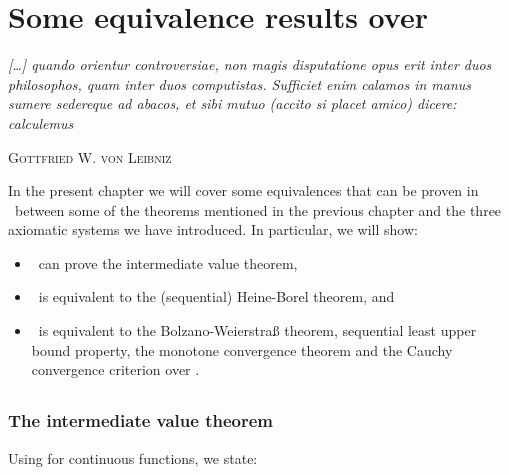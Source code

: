 \documentclass[../main.tex]{memoir}
\begin{document}
\chapter{Some equivalence results over \rca}

\epigraph{
  \textit{
    [\ldots] quando orientur controversiae, non magis disputatione opus erit inter duos
    philosophos, quam inter duos computistas. Sufficiet enim calamos in manus
    sumere sedereque ad abacos, et sibi mutuo (accito si placet amico)
    dicere: calculemus
  }
}{\textsc{Gottfried W. von Leibniz}}

In the present chapter we will cover some equivalences that can be proven in \rca\ between some of the theorems mentioned in the previous chapter and the three axiomatic systems we have introduced. In particular, we will show:

\begin{itemize}
\item \rca\ can prove the intermediate value theorem,
\item \wkl\ is equivalent to the (sequential) Heine-Borel theorem, and
\item \aca\ is equivalent to the Bolzano-Weierstra{\ss} theorem, sequential least upper bound property, the monotone convergence theorem and the Cauchy convergence criterion over \rca.
\end{itemize}

\section{\rca}

\subsection{The intermediate value theorem}

Using  for continuous functions, we state:
\end{document}

